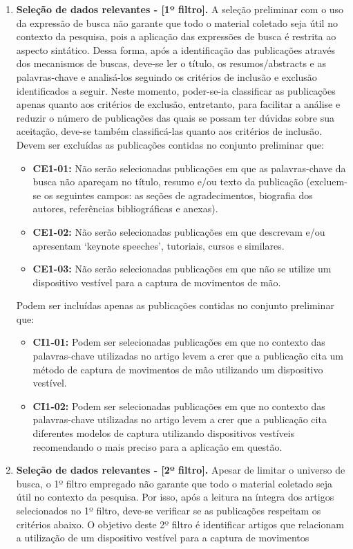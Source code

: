 \begin{enumerate}
    \item \textbf{Seleção de dados relevantes - [1º filtro].}
    A seleção preliminar com o uso da expressão de busca não
garante que todo o material coletado seja útil no contexto da pesquisa, pois a aplicação das expressões de
busca é restrita ao aspecto sintático. Dessa forma, após a identificação das publicações através dos mecanismos de buscas, deve-se ler o título, os resumos/abstracts e as palavras-chave e analisá-los seguindo os critérios de inclusão e exclusão identificados a seguir. Neste momento, poder-se-ia classificar as publicações apenas quanto aos critérios de exclusão, entretanto, para facilitar a análise e reduzir o número de publicações das quais se possam ter dúvidas sobre sua aceitação, deve-se também classificá-las quanto aos critérios de inclusão. Devem ser excluídas as publicações contidas no conjunto preliminar que:
	\begin{itemize}
		\item \textbf{CE1-01:} Não serão selecionadas publicações em que as palavras-chave da busca não apareçam no título, resumo e/ou texto da publicação (excluem-se os seguintes campos: as seções de agradecimentos, biografia dos autores, referências bibliográficas e anexas).
        \item \textbf{CE1-02:} Não serão selecionadas publicações em que descrevam e/ou apresentam ‘keynote speeches’, tutoriais, cursos e similares.
        \item \textbf{CE1-03:} Não serão selecionadas publicações em que não se utilize um dispositivo vestível para a captura de movimentos de mão.
	\end{itemize}
	Podem ser incluídas apenas as publicações contidas no conjunto preliminar que:
    \begin{itemize}
    	\item \textbf{CI1-01:} Podem ser selecionadas publicações em que no contexto das palavras-chave utilizadas no artigo levem a crer que a publicação cita um método de captura de movimentos de mão utilizando um dispositivo vestível.
        \item \textbf{CI1-02:} Podem ser selecionadas publicações em que no contexto das palavras-chave utilizadas no artigo levem a crer que a publicação cita diferentes modelos de captura utilizando dispositivos vestíveis recomendando o mais preciso para a aplicação em questão.
    \end{itemize}
    \item \textbf{Seleção de dados relevantes - [2º filtro].}
    Apesar de limitar o universo de busca, o 1º filtro empregado não garante que todo o material coletado seja útil no contexto da pesquisa. Por isso, após a leitura na íntegra dos artigos selecionados no 1º filtro, deve-se verificar se as publicações respeitam os critérios abaixo. O objetivo deste 2º filtro é identificar artigos que relacionam a utilização de um dispositivo vestível para a captura de movimentos

\end{enumerate}
